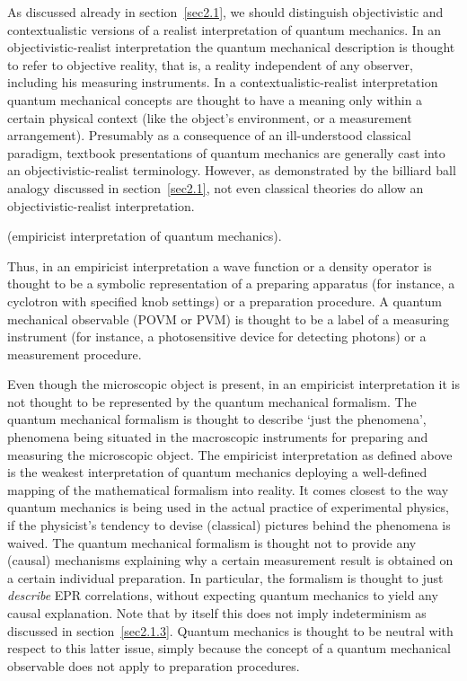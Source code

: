 \documentclass[12pt]{article}
\begin{document}
As discussed already in section~\ref{sec2.1}, we should
distinguish objectivistic and contextualistic versions of a
realist interpretation of quantum mechanics. In an
objectivistic-realist interpretation the quantum mechanical
description is thought to refer to objective reality, that is, a
reality independent of any observer, including his measuring
instruments. In a contextualistic-realist interpretation quantum
mechanical concepts are thought to have a meaning only within a
certain physical context (like the object's environment, or a
measurement arrangement). Presumably as a consequence of an
ill-understood classical paradigm, textbook presentations of
quantum mechanics are generally cast into an objectivistic-realist
terminology. However, as demonstrated by the billiard ball analogy
discussed in section~\ref{sec2.1}, not even classical theories do
allow an objectivistic-realist interpretation.

\medskip
{} (empiricist interpretation of
quantum mechanics).
\medskip

\noindent Thus, in an empiricist interpretation a wave function or
a density operator is thought to be a symbolic representation of a
preparing apparatus (for instance, a cyclotron with specified knob
settings) or a preparation procedure. A quantum mechanical
observable (POVM or PVM) is thought to be a label of a measuring
instrument (for instance, a photosensitive device for detecting
photons) or a measurement procedure.

Even though the microscopic object is present, in an
empiricist interpretation it is not thought to be represented by
the quantum mechanical formalism. The quantum mechanical formalism
is thought to describe `just the phenomena', phenomena being
situated in the macroscopic instruments for preparing and
measuring the microscopic object. The empiricist interpretation as
defined above is the weakest interpretation of quantum mechanics
deploying a well-defined mapping of the mathematical formalism
into reality. It comes closest to the way quantum mechanics is
being used in the actual practice of experimental physics, if the
physicist's tendency to devise (classical) pictures behind the
phenomena is waived. The quantum mechanical formalism is thought
not to provide any (causal) mechanisms explaining why a certain
measurement result is obtained on a certain individual
preparation. In particular, the formalism is thought to just {\em
describe} EPR correlations, without expecting quantum mechanics to
yield any causal explanation. Note that by itself this does not
imply indeterminism as discussed in section~\ref{sec2.1.3}.
Quantum mechanics is thought to be neutral with respect to this
latter issue, simply because the concept of a quantum mechanical
observable does not apply to preparation procedures.
\end{document}
